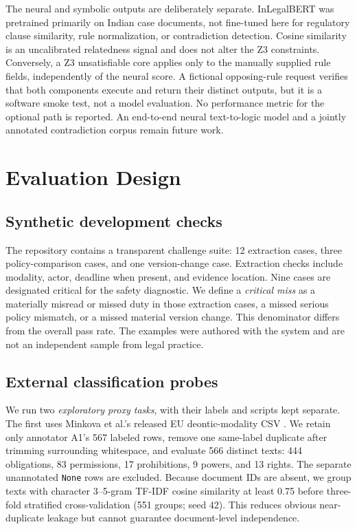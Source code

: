\documentclass[11pt,a4paper]{article}
\newcommand{\field}[1]{\texttt{#1}}
\begin{document}
The neural and symbolic outputs are deliberately separate. InLegalBERT was pretrained primarily on Indian case documents, not fine-tuned here for regulatory clause similarity, rule normalization, or contradiction detection. Cosine similarity is an uncalibrated relatedness signal and does not alter the Z3 constraints. Conversely, a Z3 unsatisfiable core applies only to the manually supplied rule fields, independently of the neural score. A fictional opposing-rule request verifies that both components execute and return their distinct outputs, but it is a software smoke test, not a model evaluation. No performance metric for the optional path is reported. An end-to-end neural text-to-logic model and a jointly annotated contradiction corpus remain future work.

\section{Evaluation Design}
\subsection{Synthetic development checks}
The repository contains a transparent challenge suite: 12 extraction cases, three policy-comparison cases, and one version-change case. Extraction checks include modality, actor, deadline when present, and evidence location. Nine cases are designated critical for the safety diagnostic. We define a \emph{critical miss} as a materially misread or missed duty in those extraction cases, a missed serious policy mismatch, or a missed material version change. This denominator differs from the overall pass rate. The examples were authored with the system and are not an independent sample from legal practice.

\subsection{External classification probes}
We run two \emph{exploratory proxy tasks}, with their labels and scripts kept separate. The first uses Minkova et al.'s released EU deontic-modality CSV \cite{minkovadata}. We retain only annotator A1's 567 labeled rows, remove one same-label duplicate after trimming surrounding whitespace, and evaluate 566 distinct texts: 444 obligations, 83 permissions, 17 prohibitions, 9 powers, and 13 rights. The separate unannotated \field{None} rows are excluded. Because document IDs are absent, we group texts with character 3--5-gram TF-IDF cosine similarity at least 0.75 before three-fold stratified cross-validation (551 groups; seed 42). This reduces obvious near-duplicate leakage but cannot guarantee document-level independence.
\end{document}
